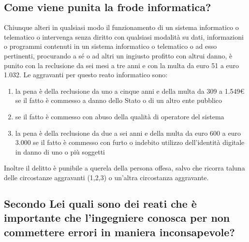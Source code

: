 \subsection{Come viene punita la frode informatica?}
Chiunque alteri in qualsiasi modo il funzionamento di un sistema informatico o telematico o intervenga senza diritto con qualsiasi modalità su dati, informazioni o programmi contenuti in un sistema informatico o telematico o ad esso pertinenti, procurando a sé o ad altri un ingiusto profitto con altrui danno, è punito con la reclusione da sei mesi a tre anni e con la multa da euro 51 a euro 1.032.
\newline
Le aggravanti per questo reato informatico sono:
\begin{enumerate}
    \item la pena è della reclusione da uno a cinque anni e della multa da 309 a 1.549€ se il fatto è commesso a danno dello Stato o di un altro ente pubblico
    \item se il fatto è commesso con abuso della qualità di operatore del sistema
    \item la pena è della reclusione da due a sei anni e della multa da euro 600 a euro 3.000 se il fatto è commesso con furto o indebito utilizzo dell'identità digitale in danno di uno o più soggetti
\end{enumerate}
Inoltre il delitto è punibile a querela della persona offesa, salvo che ricorra taluna delle circostanze aggravanti (1,2,3) o un'altra circostanza aggravante.
\subsection{Secondo Lei quali sono dei reati che è importante che l'ingegniere conosca per non commettere errori in maniera inconsapevole?}

